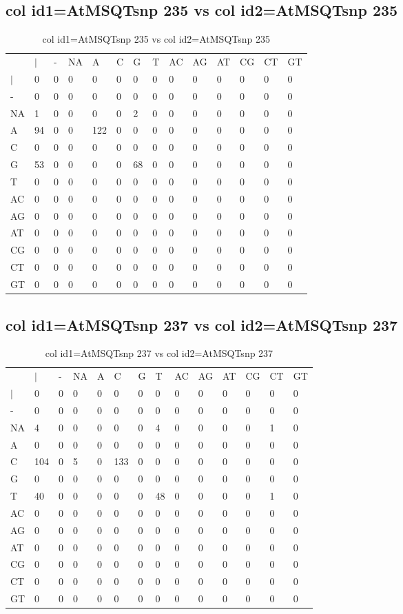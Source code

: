 \subsection{col id1=AtMSQTsnp 235 vs col id2=AtMSQTsnp 235}
\begin{center}
\begin{longtable}{|l|l|l|l|l|l|l|l|l|l|l|l|l|l|}
\caption{col id1=AtMSQTsnp 235 vs col id2=AtMSQTsnp 235} \label{table_dm788}\\
\hline
\\
\hline
&$|$&-&NA&A&C&G&T&AC&AG&AT&CG&CT&GT\\
$|$&0&0&0&0&0&0&0&0&0&0&0&0&0\\
-&0&0&0&0&0&0&0&0&0&0&0&0&0\\
NA&1&0&0&0&0&2&0&0&0&0&0&0&0\\
A&94&0&0&122&0&0&0&0&0&0&0&0&0\\
C&0&0&0&0&0&0&0&0&0&0&0&0&0\\
G&53&0&0&0&0&68&0&0&0&0&0&0&0\\
T&0&0&0&0&0&0&0&0&0&0&0&0&0\\
AC&0&0&0&0&0&0&0&0&0&0&0&0&0\\
AG&0&0&0&0&0&0&0&0&0&0&0&0&0\\
AT&0&0&0&0&0&0&0&0&0&0&0&0&0\\
CG&0&0&0&0&0&0&0&0&0&0&0&0&0\\
CT&0&0&0&0&0&0&0&0&0&0&0&0&0\\
GT&0&0&0&0&0&0&0&0&0&0&0&0&0\\
\hline
\end{longtable}
\end{center}

\subsection{col id1=AtMSQTsnp 237 vs col id2=AtMSQTsnp 237}
\begin{center}
\begin{longtable}{|l|l|l|l|l|l|l|l|l|l|l|l|l|l|}
\caption{col id1=AtMSQTsnp 237 vs col id2=AtMSQTsnp 237} \label{table_dm790}\\
\hline
\\
\hline
&$|$&-&NA&A&C&G&T&AC&AG&AT&CG&CT&GT\\
$|$&0&0&0&0&0&0&0&0&0&0&0&0&0\\
-&0&0&0&0&0&0&0&0&0&0&0&0&0\\
NA&4&0&0&0&0&0&4&0&0&0&0&1&0\\
A&0&0&0&0&0&0&0&0&0&0&0&0&0\\
C&104&0&5&0&133&0&0&0&0&0&0&0&0\\
G&0&0&0&0&0&0&0&0&0&0&0&0&0\\
T&40&0&0&0&0&0&48&0&0&0&0&1&0\\
AC&0&0&0&0&0&0&0&0&0&0&0&0&0\\
AG&0&0&0&0&0&0&0&0&0&0&0&0&0\\
AT&0&0&0&0&0&0&0&0&0&0&0&0&0\\
CG&0&0&0&0&0&0&0&0&0&0&0&0&0\\
CT&0&0&0&0&0&0&0&0&0&0&0&0&0\\
GT&0&0&0&0&0&0&0&0&0&0&0&0&0\\
\hline
\end{longtable}
\end{center}

